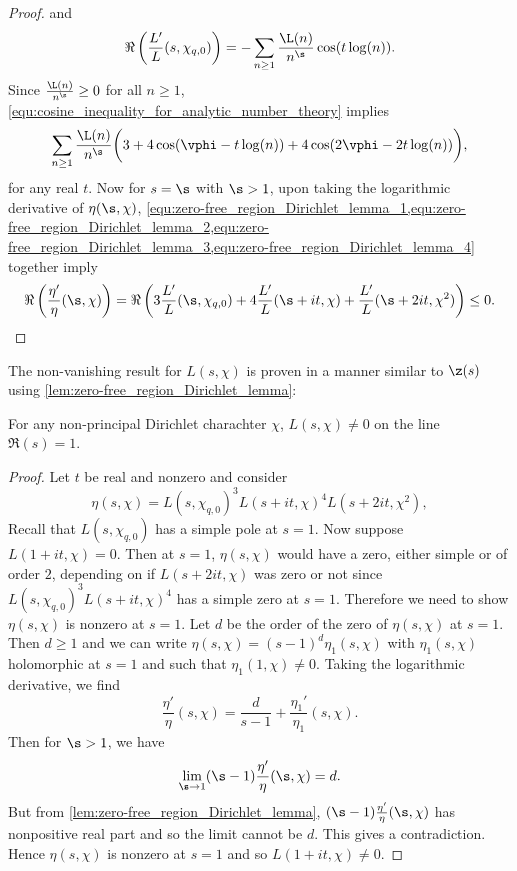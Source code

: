 \begin{proof}
        and
        \begin{equation}\label{equ:zero-free_region_Dirichlet_lemma_3}
          \Re\left(\frac{L'}{L}(s,\chi_{q,0})\right) = -\sum_{n \ge 1}\frac{\L(n)}{n^{\s}}\cos(t\log(n)).
        \end{equation}
        Since $\frac{\L(n)}{n^{\s}} \ge 0$ for all $n \ge 1$, \cref{equ:cosine_inequality_for_analytic_number_theory} implies
        \begin{equation}\label{equ:zero-free_region_Dirichlet_lemma_4}
          \sum_{n \ge 1}\frac{\L(n)}{n^{\s}}\bigg(3+4\cos(\vphi-t\log(n))+4\cos(2\vphi-2t\log(n))\bigg),
        \end{equation}
        for any real $t$. Now for $s = \s$ with $\s > 1$, upon taking the logarithmic derivative of $\eta(\s,\chi)$, \cref{equ:zero-free_region_Dirichlet_lemma_1,equ:zero-free_region_Dirichlet_lemma_2,equ:zero-free_region_Dirichlet_lemma_3,equ:zero-free_region_Dirichlet_lemma_4} together imply
        \[
          \Re\left(\frac{\eta'}{\eta}(\s,\chi)\right) = \Re\left(3\frac{L'}{L}(\s,\chi_{q,0})+4\frac{L'}{L}(\s+it,\chi)+\frac{L'}{L}(\s+2it,\chi^{2})\right) \le 0.
        \]
      \end{proof}

      The non-vanishing result for $L(s,\chi)$ is proven in a manner similar to $\z(s)$ using \cref{lem:zero-free_region_Dirichlet_lemma}:

      \begin{theorem}\label{thm:non-vanishing_of_Dirichlet_on_Re(s)=1}
        For any non-principal Dirichlet charachter $\chi$, $L(s,\chi) \neq 0$ on the line $\Re(s) = 1$.
      \end{theorem}
      \begin{proof}
        Let $t$ be real and nonzero and consider
        \[
          \eta(s,\chi) = L(s,\chi_{q,0})^{3}L(s+it,\chi)^{4}L(s+2it,\chi^{2}),
        \]
        Recall that $L(s,\chi_{q,0})$ has a simple pole at $s = 1$. Now suppose $L(1+it,\chi) = 0$. Then at $s = 1$, $\eta(s,\chi)$ would have a zero, either simple or of order $2$, depending on if $L(s+2it,\chi)$ was zero or not since $L(s,\chi_{q,0})^{3}L(s+it,\chi)^{4}$ has a simple zero at $s = 1$. Therefore we need to show $\eta(s,\chi)$ is nonzero at $s = 1$. Let $d$ be the order of the zero of $\eta(s,\chi)$ at $s = 1$. Then $d \ge 1$ and we can write $\eta(s,\chi) = (s-1)^{d}\eta_{1}(s,\chi)$ with $\eta_{1}(s,\chi)$ holomorphic at $s = 1$ and such that $\eta_{1}(1,\chi) \neq 0$. Taking the logarithmic derivative, we find
        \[
          \frac{\eta'}{\eta}(s,\chi) = \frac{d}{s-1}+\frac{\eta_{1}'}{\eta_{1}}(s,\chi).
        \]
        Then for $\s > 1$, we have
        \[
          \lim_{\s \to 1}(\s-1)\frac{\eta'}{\eta}(\s,\chi) = d.
        \]
        But from \cref{lem:zero-free_region_Dirichlet_lemma}, $(\s-1)\frac{\eta'}{\eta}(\s,\chi)$ has nonpositive real part and so the limit cannot be $d$. This gives a contradiction. Hence $\eta(s,\chi)$ is nonzero at $s = 1$ and so $L(1+it,\chi) \neq 0$.
      \end{proof}

